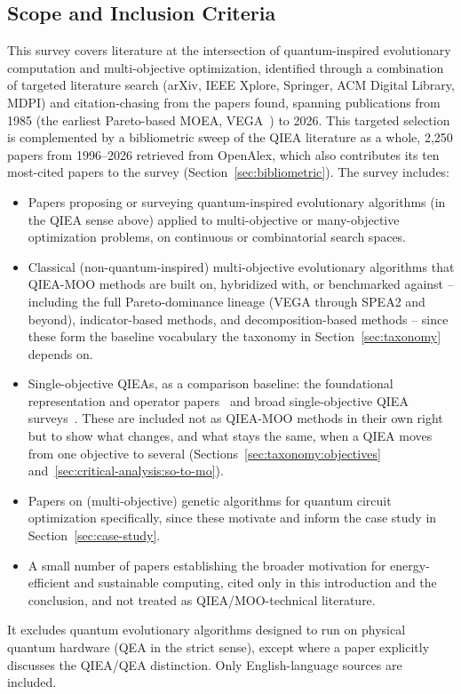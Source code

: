 \subsection{Scope and Inclusion Criteria}
\label{sec:introduction:scope}

This survey covers literature at the intersection of quantum-inspired
evolutionary computation and multi-objective optimization, identified
through a combination of targeted literature search (arXiv, IEEE Xplore,
Springer, ACM Digital Library, MDPI) and citation-chasing from the papers
found, spanning publications from 1985 (the earliest Pareto-based MOEA,
VEGA~\citep{schaffer1985vega}) to 2026. This targeted selection is
complemented by a bibliometric sweep of the QIEA literature as a whole,
2{,}250 papers from 1996--2026 retrieved from OpenAlex, which also
contributes its ten most-cited papers to the survey
(Section~\ref{sec:bibliometric}). The survey includes:
\begin{itemize}
  \item Papers proposing or surveying quantum-inspired evolutionary
    algorithms (in the QIEA sense above) applied to multi-objective or
    many-objective optimization problems, on continuous or combinatorial
    search spaces.
  \item Classical (non-quantum-inspired) multi-objective evolutionary
    algorithms that QIEA-MOO methods are built on, hybridized with, or
    benchmarked against -- including the full Pareto-dominance lineage
    (VEGA through SPEA2 and beyond), indicator-based methods, and
    decomposition-based methods -- since these form the baseline
    vocabulary the taxonomy in Section~\ref{sec:taxonomy} depends on.
  \item Single-objective QIEAs, as a comparison baseline: the foundational
    representation and operator
    papers~\citep{narayanan1996qiga,han2002qea,han2004hepsilon} and
    broad single-objective QIEA
    surveys~\citep{zhang2011qieasurvey,vivek2025fss}. These are included
    not as QIEA-MOO methods in their own right but to show what changes,
    and what stays the same, when a QIEA moves from one objective to
    several (Sections~\ref{sec:taxonomy:objectives}
    and~\ref{sec:critical-analysis:so-to-mo}).
  \item Papers on (multi-objective) genetic algorithms for quantum
    circuit optimization specifically, since these motivate and inform
    the case study in Section~\ref{sec:case-study}.
  \item A small number of papers establishing the broader motivation for
    energy-efficient and sustainable computing, cited only in this
    introduction and the conclusion, and not treated as QIEA/MOO-technical
    literature.
\end{itemize}
It excludes quantum evolutionary algorithms designed to run on physical
quantum hardware (QEA in the strict sense), except where a paper
explicitly discusses the QIEA/QEA distinction. Only English-language
sources are included.

